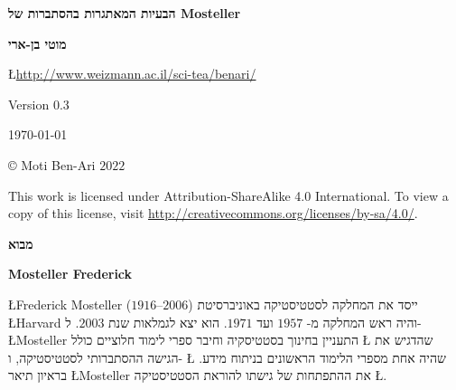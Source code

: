 


\thispagestyle{empty}

\begin{center}
\textbf{\LARGE הבעיות המאתגרות בהסתברות של Mosteller}

\bigskip
\bigskip
\bigskip

\textbf{\Large מוטי בן-ארי}

\bigskip

\L{\url{http://www.weizmann.ac.il/sci-tea/benari/}}

\bigskip
\bigskip
\bigskip

Version $0.3$

\bigskip

\today

\end{center}

\vfill

\begin{center}
\copyright{} Moti Ben-Ari $2022$
 \end{center}
 
\begin{small}
This work is licensed under Attribution-ShareAlike 4.0 International. To view a copy of this license, visit \url{http://creativecommons.org/licenses/by-sa/4.0/}.
\end{small}
\newpage


\tableofcontents

\newpage

\begin{center}
\textbf{\Large מבוא}
\end{center}


\bigskip

\textbf{Mosteller Frederick}

\L{Frederick Mosteller}
($1916$--$2006$)
ייסד את המחלקה לסטטיסטיקה באוניברסיטת 
\L{Harvard}
והיה ראש המחלקה מ-%
$1957$
ועד
$1971$.
הוא יצא לגמלאות שנת
$2003$.
ל-%
\L{Mosteller}
התעניין בחינוך בסטטיסקיה וחיבר ספרי לימוד חלוציים כולל 
\L{\cite{pwsa}}
שהדגיש את הגישה ההסתברותי לסטטיסטיקה, ו-%
\L{\cite{bsda}}
שהיה אחת מספרי הלימוד הראשונים בניתוח מידע. בראיון תיאר 
\L{Mosteller}
את ההתפתחות של גישתו להוראת הסטטיסטיקה
\L{\cite{gse}}.


